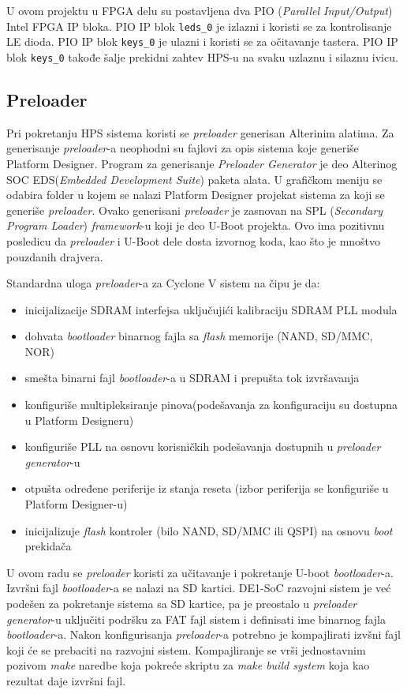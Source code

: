 U ovom projektu u FPGA delu su postavljena dva PIO (\textit{Parallel Input/Output}) Intel FPGA IP bloka. PIO IP blok \texttt{leds\_0} je izlazni i koristi se za kontrolisanje LE dioda. PIO IP blok \texttt{keys\_0} je ulazni i koristi se za očitavanje tastera. PIO IP blok \texttt{keys\_0} takođe šalje prekidni zahtev HPS-u na svaku uzlaznu i silaznu ivicu.

\subsection{Preloader}
Pri pokretanju HPS sistema koristi se \textit{preloader} generisan Alterinim alatima. Za generisanje \textit{preloader}-a neophodni su fajlovi za opis sistema koje generiše Platform Designer. Program za generisanje \textit{Preloader Generator} je deo Alterinog SOC EDS(\textit{Embedded Development Suite}) paketa alata. U grafičkom meniju se odabira folder u kojem se nalazi Platform Designer projekat sistema za koji se generiše \textit{preloader}. Ovako generisani \textit{preloader} je zasnovan na SPL (\textit{Secondary Program Loader}) \textit{framework}-u koji je deo U-Boot projekta. Ovo ima pozitivnu posledicu da \textit{preloader} i U-Boot dele dosta izvornog koda, kao što je mnoštvo pouzdanih drajvera.

Standardna uloga \textit{preloader}-a za Cyclone V sistem na čipu je da:
\begin{itemize}
\item inicijalizacije SDRAM interfejsa uključujići kalibraciju SDRAM PLL modula
\item dohvata \textit{bootloader} binarnog fajla sa \textit{flash} memorije (NAND, SD/MMC, NOR)
\item smešta binarni fajl \textit{bootloader}-a u SDRAM i prepušta tok izvršavanja
\item konfiguriše multipleksiranje pinova(podešavanja za konfiguraciju su dostupna u Platform Designeru)
\item konfiguriše PLL na osnovu korisničkih podešavanja dostupnih u \textit{preloader generator}-u
\item otpušta određene periferije iz stanja reseta (izbor periferija se konfiguriše u Platform Designer-u)
\item inicijalizuje \textit{flash} kontroler (bilo NAND, SD/MMC ili QSPI) na osnovu \textit{boot} prekidača
\end{itemize}

U ovom radu se \textit{preloader} koristi za učitavanje i pokretanje U-boot \textit{bootloader}-a. Izvršni fajl \textit{bootloader}-a se nalazi na SD kartici. DE1-SoC razvojni sistem je već podešen za pokretanje sistema sa SD kartice, pa je preostalo u \textit{preloader generator}-u uključiti podršku za FAT fajl sistem i definisati ime binarnog fajla \textit{bootloader}-a. Nakon konfigurisanja \textit{preloader}-a potrebno je kompajlirati izvšni fajl koji će se prebaciti na razvojni sistem. Kompajliranje se vrši jednostavnim pozivom \textit{make} naredbe koja pokreće skriptu za \textit{make build system} koja kao rezultat daje izvršni fajl.

